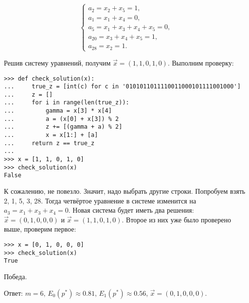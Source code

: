 \begin{equation*}
\begin{cases}
a_2 = x_2 + x_5 = 1, \\
a_1 = x_1 + x_4 = 0, \\
a_5 = x_1 + x_3 + x_4 + x_5 = 0, \\
a_{20} = x_3 + x_4 + x_5 = 1, \\
a_{28} = x_2 = 1.
\end{cases}
\end{equation*}

Решив систему уравнений, получим $\vec{x} = (1, 1, 0, 1, 0)$. Выполним проверку:

\begin{lstlisting}
>>> def check_solution(x):
... 	true_z = [int(c) for c in '0101011011110011000101111001000']
... 	z = []
... 	for i in range(len(true_z)):
... 		gamma = x[3] * x[4]
... 		a = (x[0] + x[3]) % 2
... 		z += [(gamma + a) % 2]
... 		x = x[1:] + [a]
... 	return z == true_z
... 
>>> x = [1, 1, 0, 1, 0]
>>> check_solution(x)
False
\end{lstlisting}

К сожалению, не повезло. Значит, надо выбрать другие строки. Попробуем взять 2, 1, 5, 3, 28. Тогда четвёртое уравнение в системе изменится на $a_3 = x_1 + x_3 + x_4 = 0$. Новая система будет иметь два решения: $\vec{x} = (0, 1, 0, 0, 0)$ и $\vec{x} = (1, 1, 0, 1, 0)$. Второе из них уже было проверено выше, проверим первое:

\begin{lstlisting}
>>> x = [0, 1, 0, 0, 0]
>>> check_solution(x)
True
\end{lstlisting}

Победа.

Ответ: $m = 6$, $E_0 (p^*) \approx 0.81$, $E_1 (p^*) \approx 0.56$, $\vec{x} = (0, 1, 0, 0, 0)$.
